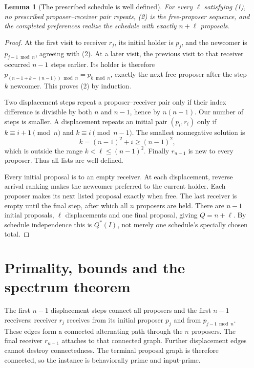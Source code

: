 \documentclass[11pt,a4paper]{article}
\newtheorem{lemma}[theorem]{Lemma}
\begin{document}
\begin{lemma}[The prescribed schedule is well defined]
For every $\ell$ satisfying (1), no prescribed proposer--receiver pair repeats, (2) is the free-proposer sequence, and the completed preferences realize the schedule with exactly $n+\ell$ proposals.
\end{lemma}
\begin{proof}
At the first visit to receiver $r_j$, its initial holder is $p_j$, and the newcomer is $p_{j-1\bmod n}$, agreeing with (2). At a later visit, the previous visit to that receiver occurred $n-1$ steps earlier. Its holder is therefore
$p_{(n-1+k-(n-1))\bmod n}=p_{k\bmod n}$, exactly the next free proposer after the step-$k$ newcomer. This proves (2) by induction.

Two displacement steps repeat a proposer--receiver pair only if their index difference is divisible by both $n$ and $n-1$, hence by $n(n-1)$. Our number of steps is smaller. A displacement repeats an initial pair $(p_i,r_i)$ only if
$k\equiv i+1\pmod n$ and $k\equiv i\pmod{n-1}$.
The smallest nonnegative solution is
\[
 k=(n-1)^2+i\ge(n-1)^2,
\]
which is outside the range $k<\ell\le(n-1)^2$. Finally $r_{n-1}$ is new to every proposer. Thus all lists are well defined.

Every initial proposal is to an empty receiver. At each displacement, reverse arrival ranking makes the newcomer preferred to the current holder. Each proposer makes its next listed proposal exactly when free. The last receiver is empty until the final step, after which all $n$ proposers are held. There are $n-1$ initial proposals, $\ell$ displacements and one final proposal, giving $Q=n+\ell$. By schedule independence this is $Q^*(I)$, not merely one schedule's specially chosen total.
\end{proof}

\section{Primality, bounds and the spectrum theorem}
The first $n-1$ displacement steps connect all proposers and the first $n-1$ receivers: receiver $r_j$ receives from its initial proposer $p_j$ and from $p_{j-1\bmod n}$. These edges form a connected alternating path through the $n$ proposers. The final receiver $r_{n-1}$ attaches to that connected graph. Further displacement edges cannot destroy connectedness. The terminal proposal graph is therefore connected, so the instance is behaviorally prime and input-prime.
\end{document}

